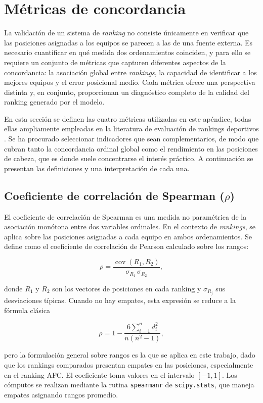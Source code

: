 \section{M\'etricas de concordancia}

La validaci\'on de un sistema de \textit{ranking} no consiste \'unicamente en verificar que las posiciones asignadas a los equipos se parecen a las de una fuente externa. Es necesario cuantificar en qu\'e medida dos ordenamientos coinciden, y para ello se requiere un conjunto de m\'etricas que capturen diferentes aspectos de la concordancia: la asociaci\'on global entre \textit{rankings}, la capacidad de identificar a los mejores equipos y el error posicional medio. Cada m\'etrica ofrece una perspectiva distinta y, en conjunto, proporcionan un diagn\'ostico completo de la calidad del ranking generado por el modelo.

En esta secci\'on se definen las cuatro m\'etricas utilizadas en este ap\'endice, todas ellas ampliamente empleadas en la literatura de evaluaci\'on de rankings deportivos \cite{kendall1945, spearman1904, Glickman2022}. Se ha procurado seleccionar indicadores que sean complementarios, de modo que cubran tanto la concordancia ordinal global como el rendimiento en las posiciones de cabeza, que es donde suele concentrarse el inter\'es pr\'actico. A continuaci\'on se presentan las definiciones y una interpretaci\'on de cada una.

\subsection{Coeficiente de correlaci\'on de Spearman (\(\rho\))}

El coeficiente de correlaci\'on de Spearman es una medida no param\'etrica de la asociaci\'on mon\'otona entre dos variables ordinales. En el contexto de \textit{rankings}, se aplica sobre las posiciones asignadas a cada equipo en ambos ordenamientos. Se define como el coeficiente de correlaci\'on de Pearson calculado sobre los rangos:

\[
\rho = \frac{\operatorname{cov}(R_1, R_2)}{\sigma_{R_1}\,\sigma_{R_2}},
\]

donde $R_1$ y $R_2$ son los vectores de posiciones en cada ranking y $\sigma_{R_j}$ sus desviaciones t\'ipicas. Cuando no hay empates, esta expresi\'on se reduce a la f\'ormula cl\'asica

\[
\rho = 1 - \frac{6 \sum_{i=1}^{n} d_i^2}{n(n^2 - 1)},
\]

pero la formulaci\'on general sobre rangos es la que se aplica en este trabajo, dado que los rankings comparados presentan empates en las posiciones, especialmente en el ranking AFC. El coeficiente toma valores en el intervalo $[-1, 1]$. Los c\'omputos se realizan mediante la rutina \texttt{spearmanr} de \texttt{scipy.stats}, que maneja empates asignando rangos promedio.

